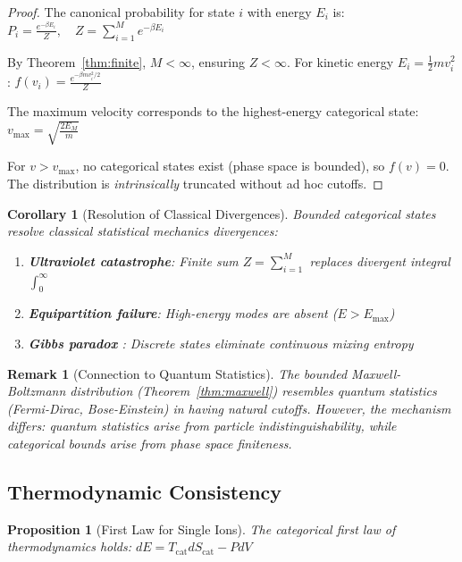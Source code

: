 \documentclass[twocolumn,10pt]{article}
\newtheorem{proposition}[theorem]{Proposition}
\newtheorem{corollary}[theorem]{Corollary}
\newtheorem{remark}[theorem]{Remark}
\begin{document}
\begin{proof}
The canonical probability for state $i$ with energy $E_i$ is:
$
P_i = \frac{e^{-\beta E_i}}{Z}, \quad Z = \sum_{i=1}^{M} e^{-\beta E_i}
$

By Theorem~\ref{thm:finite}, $M < \infty$, ensuring $Z < \infty$. For kinetic energy $E_i = \frac{1}{2}mv_i^2$:
$
f(v_i) = \frac{e^{-\beta m v_i^2/2}}{Z}
$

The maximum velocity corresponds to the highest-energy categorical state:
$
v_{\max} = \sqrt{\frac{2E_M}{m}}
$

For $v > v_{\max}$, no categorical states exist (phase space is bounded), so $f(v) = 0$. The distribution is \emph{intrinsically} truncated without ad hoc cutoffs.
\end{proof}

\begin{corollary}[Resolution of Classical Divergences]
\label{cor:divergence}
Bounded categorical states resolve classical statistical mechanics divergences:
\begin{enumerate}
    \item \textbf{Ultraviolet catastrophe}: Finite sum $Z = \sum_{i=1}^{M}$ replaces divergent integral $\int_0^\infty$
    \item \textbf{Equipartition failure}: High-energy modes are absent ($E > E_{\max}$)
    \item \textbf{Gibbs paradox} \citep{jaynes1992gibbs,swendsen2006statistical}: Discrete states eliminate continuous mixing entropy
\end{enumerate}
\end{corollary}

\begin{remark}[Connection to Quantum Statistics]
The bounded Maxwell-Boltzmann distribution (Theorem~\ref{thm:maxwell}) resembles quantum statistics (Fermi-Dirac, Bose-Einstein) in having natural cutoffs. However, the mechanism differs: quantum statistics arise from particle indistinguishability, while categorical bounds arise from phase space finiteness.
\end{remark}

\subsection{Thermodynamic Consistency}

\begin{proposition}[First Law for Single Ions]
\label{prop:first_law}
The categorical first law of thermodynamics holds:
$
dE = T_{\mathrm{cat}} dS_{\mathrm{cat}} - P dV
$
\end{proposition}
\end{document}
